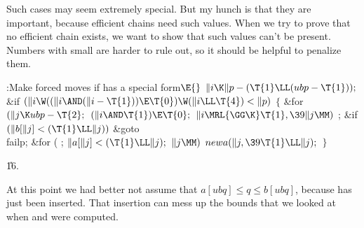 Such cases may seem extremely special. But my hunch is that they are
important, because efficient chains need such values. When we try
to prove that no efficient chain exists, we want to show that
such values can't be present. Numbers with small  are harder
to rule out, so it should be helpful to penalize them.

\Y\B\4:Make forced moves if  has a special form\X${}\E{}$\6
$\|i\K\|p-(\T{1}\LL(\\{ubp}-\T{1}));{}$\6
\&{if} ${}(\|i\W((\|i\AND(\|i-\T{1}))\E\T{0})\W(\|i\LL\T{4})<\|p){}$\5
${}\{{}$\1\6
\&{for} ${}(\|j\K\\{ubp}-\T{2};{}$ ${}(\|i\AND\T{1})\E\T{0};{}$ ${}\|i\MRL{{%
\GG}{\K}}\T{1},\39\|j\MM){}$\1\5
;\2\6
\&{if} ${}(\|b[\|j]<(\T{1}\LL\|j)){}$\1\5
\&{goto} \\{failp};\2\6
\&{for} ( ; ${}\|a[\|j]<(\T{1}\LL\|j);{}$ ${}\|j\MM){}$\1\5
${}\\{newa}(\|j,\39\T{1}\LL\|j);{}$\2\6
\4${}\}{}$\2\par
\U16.\fi

At this point we had better not assume that $a[ubq]\le q\le b[ubq]$,
because  has just been inserted. That insertion can mess up the
bounds that we looked at when  and  were computed.

